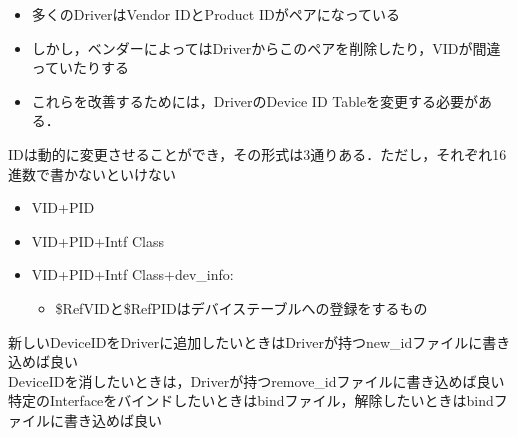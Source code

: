 \documentclass[10pt]{jreport}
\begin{document}
\begin{description}
\begin{itemize}
            \item 多くのDriverはVendor IDとProduct IDがペアになっている
            \item しかし，ベンダーによってはDriverからこのペアを削除したり，VIDが間違っていたりする
            \item これらを改善するためには，DriverのDevice ID Tableを変更する必要がある．
          \end{itemize}
          IDは動的に変更させることができ，その形式は3通りある．ただし，それぞれ16進数で書かないといけない
          \begin{itemize}
            \item VID+PID
            \item VID+PID+Intf Class
            \item VID+PID+Intf Class+dev_info:
            \begin{itemize}
              \item \$RefVIDと\$RefPIDはデバイステーブルへの登録をするもの
            \end{itemize}
          \end{itemize}
          新しいDeviceIDをDriverに追加したいときはDriverが持つnew\_idファイルに書き込めば良い\\
          DeviceIDを消したいときは，Driverが持つremove\_idファイルに書き込めば良い\\
          特定のInterfaceをバインドしたいときはbindファイル，解除したいときはbindファイルに書き込めば良い\\\\


\end{description}
\end{document}
